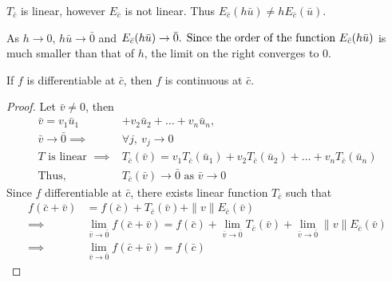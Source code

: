 \begin{note}
$T_{\bar{c}}$ is linear, however $E_{\bar{c}}$ is not linear.
Thus $E_{\bar{c}}(h\bar{u}) \ne h E_{\bar{c}} (\bar{u})$.

As $h \to 0$, $h\bar{u} \to \bar{0}$ and \( E_{\bar{c}}(h\bar{u}) \to \bar{0}$.
Since the order of the function \( E_{\bar{c}}(h\bar{u}) \) is much smaller than that of $h$, the limit on the right converges to 0.
\end{note}

\begin{theorem}
If $f$ is differentiable at \( \bar{c} \), then $f$ is continuous at \( \bar{c} \).
\end{theorem}
\begin{proof}
Let $\bar{v} \ne 0$, then
\begin{align*}
	\bar{v} = v_1 \bar{u}_1 & + v_2 \bar{u}_2 + \dots + v_n \bar{u}_n,\\
	\bar{v} \to \bar{0} \implies & \forall j,\ v_j \to 0 \\
	T \text{ is linear }\implies & T_{\bar{c}} (\bar{v}) = v_1 T_{\bar{c}}(\bar{u}_1) + v_2 T_{\bar{c}}(\bar{u}_2) + \dots + v_n T_{\bar{c}}(\bar{u}_n)\\
	\text{Thus, } & T_{\bar{c}}(\bar{v}) \to \bar{0} \text{ as } \bar{v} \to 0
\end{align*}
Since $f$ differentiable at \( \bar{c} \), there exists linear function $T_{\bar{c}}$ such that
\begin{align*}
	f(\bar{c}+\bar{v}) & =  f(\bar{c}) + T_{\bar{c}}(\bar{v}) + \|v\|E_{\bar{c}}(\bar{v}) \\
	\implies & \lim_{\bar{v} \to \bar{0}} f(\bar{c}+\bar{v}) = f(\bar{c}) + \lim_{\bar{v} \to \bar{0}} T_{\bar{c}}(\bar{v}) + \lim_{\bar{v} \to \bar{0}} \|v\|E_{\bar{c}}(\bar{v})\\
	\implies & \lim_{\bar{v} \to \bar{0}} f(\bar{c}+\bar{v}) = f(\bar{c})
\end{align*}
\end{proof}

